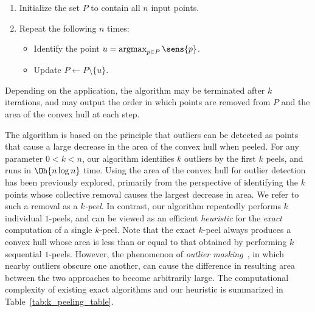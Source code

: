 \begin{samepage}
\begin{enumerate}
    \item Initialize the set $P$ to contain all $n$ input points.
    \item Repeat the following $n$ times:
    \begin{itemize}
        \item Identify the point $u = \operatorname*{argmax}_{p \in P} \sens{p}$.
        \item Update $P \leftarrow P \setminus \{u\}$.
    \end{itemize}
\end{enumerate}
\end{samepage}


Depending on the application, the algorithm may be terminated after $k$ iterations, and may output the order in which points are removed from $P$ and the area of the convex hull at each step.

The algorithm is based on the principle that outliers can be detected as points that cause a large decrease in the area of the convex hull when peeled. 
For any parameter $0 < k < n$, our algorithm identifies $k$ outliers by the first $k$ peels, and runs in $\Oh{n \log n}$ time. 
Using the area of the convex hull for outlier detection has been previously explored, primarily from the perspective of identifying the $k$ points whose collective removal causes the largest decrease in area. 
We refer to such a removal as a \emph{$k$-peel}. 
In contrast, our algorithm repeatedly performs $k$ individual $1$-peels, and can be viewed as an efficient \emph{heuristic} for the \emph{exact} computation of a single $k$-peel. 
Note that the exact $k$-peel always produces a convex hull whose area is less than or equal to that obtained by performing $k$ sequential $1$-peels. 
However, the phenomenon of \emph{outlier masking}~\cite{4781136, murphy1951tests, AcunaRodriguez2004}, in which nearby outliers obscure one another, can cause the difference in resulting area between the two approaches to become arbitrarily large. 
The computational complexity of existing exact algorithms and our heuristic is summarized in Table~\ref{tab:k_peeling_table}. 

